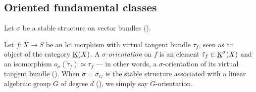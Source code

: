 \subsection{Oriented fundamental classes}

\begin{df}
Let $\sigma$ be a stable structure on vector bundles ().

Let $f:X \rightarrow S$ be an lci morphism with virtual tangent bundle $\tau_f$,
 seen as an object of the category $\operatorname{\underline K}(X)$.
 A \emph{$\sigma$-orientation} on $f$ is an element $\tilde \tau_f \in \operatorname{\underline K}^\sigma(X)$ and an isomorphism
 $o_\sigma(\tilde \tau_f) \simeq \tau_f$ --- in other words, a $\sigma$-orientation of its virtual
 tangent bundle ().
 When $\sigma=\sigma_G$ is the stable structure associated with a linear algebraic group $G$ of degree $d$
 (), we simply say $G$-orientation.
\end{df}

%

